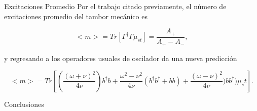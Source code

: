 \documentclass[11pt]{beamer}
\begin{document}
\begin{frame}{Excitaciones Promedio}
Por el trabajo citado previamente, el número de excitaciones promedio del tambor mecánico es

\begin{equation}
<m> = Tr[\Gamma^\dagger \Gamma \mu_{st}] = \frac{A_+}{A_+ - A_-},
\end{equation}

y regresando a los operadores usuales de oscilador da una nueva predicción

\begin{equation}
<m> = Tr[(\frac{(\omega + \nu )^2}{4\nu})b^\dagger b +\frac{\omega^2 - \nu^2}{4\nu}(b^\dagger b^\dagger +bb) +\frac{(\omega - \nu )^2}{4\nu}) b b^\dagger)\mu_st].
\end{equation}

\end{frame}

\begin{frame}{Conclusiones}



\end{frame}



\end{document}
